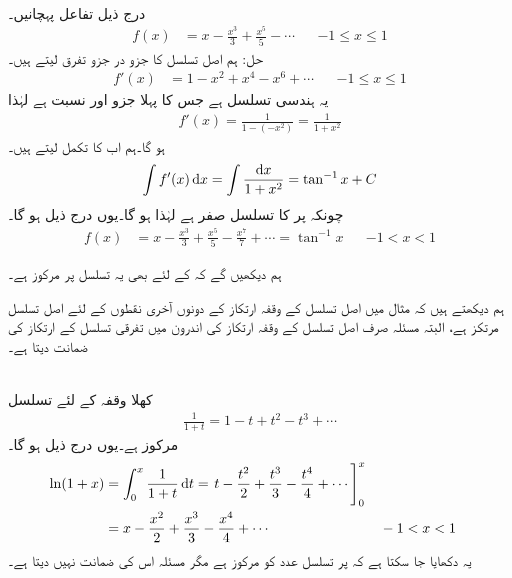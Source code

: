 \\
درج ذیل تفاعل پہچانیں۔
\begin{align*}
f(x)&=x-\frac{x^3}{3}+\frac{x^5}{5}-\cdots&&-1\le x\le 1
\end{align*}
حل:\quad
ہم اصل تسلسل کا جزو در جزو تفرق لیتے ہیں۔
\begin{align*}
f'(x)&=1-x^2+x^4-x^6+\cdots&&-1\le x\le 1
\end{align*}
یہ ہندسی تسلسل ہے جس کا پہلا جزو  اور نسبت  ہے لہٰذا
\begin{align*}
f'(x)=\frac{1}{1-(-x^2)}=\frac{1}{1+x^2}
\end{align*}
ہو گا۔ہم اب  کا تکمل لیتے ہیں۔
\begin{align*}
\int f'(x)\dif x=\int\frac{\dif x}{1+x^2}=\tan^{-1}x+C
\end{align*}
چونکہ  پر  کا تسلسل صفر ہے لہٰذا  ہو گا۔یوں درج ذیل ہو گا۔
\begin{align}
f(x)&=x-\frac{x^3}{3}+\frac{x^5}{5}-\frac{x^7}{7}+\cdots=\tan^{-1}x&&-1<x<1
\end{align}

ہم دیکھیں گے کہ  کے لئے بھی یہ تسلسل  پر مرکوز ہے۔

ہم دیکھتے ہیں کہ مثال  میں اصل تسلسل کے وقفہ ارتکاز کے   دونوں آخری نقطوں کے لئے اصل تسلسل مرتکز ہے، البتہ مسئلہ  صرف اصل تسلسل کے وقفہ ارتکاز کی اندرون میں تفرقی تسلسل کے ارتکاز کی ضمانت دیتا ہے۔

\\
کھلا وقفہ  کے لئے تسلسل
\begin{align*}
\frac{1}{1+t}=1-t+t^2-t^3+\cdots
\end{align*}
 مرکوز ہے۔یوں درج ذیل ہو گا۔
\begin{align*}
\ln(1+x)&=\int_0^x\frac{1}{1+t}\dif t=\left. t-\frac{t^2}{2}+\frac{t^3}{3}-\frac{t^4}{4}+\cdots\right]_0^x\\
&=x-\frac{x^2}{2}+\frac{x^3}{3}-\frac{x^4}{4}+\cdots&&-1<x<1
\end{align*}
یہ دکھایا جا سکتا ہے کہ  پر تسلسل عدد  کو مرکوز ہے  مگر مسئلہ اس کی ضمانت نہیں دیتا ہے۔

